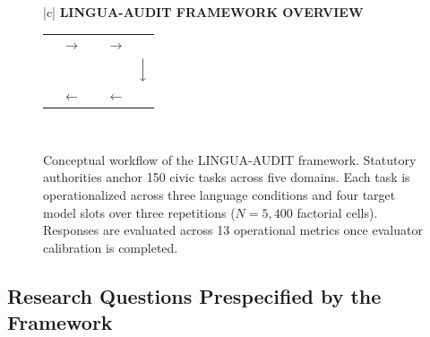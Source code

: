 \documentclass[11pt,a4paper]{article}
\begin{document}
\begin{figure}[htbp]
\centering
\small
\begin{tabular}{|c|}
\hline
\textbf{LINGUA-AUDIT FRAMEWORK OVERVIEW} \\[0.5em]
\begin{tabular}{ccccc}
\fbox{\parbox{3.5cm}{\centering \textbf{Statutory Authorities}\\ (Acts, Portals, Rules)}}
& $\longrightarrow$ &
\fbox{\parbox{3.5cm}{\centering \textbf{150 Benchmark Tasks}\\ (5 Civic Domains)}}
& $\longrightarrow$ &
\fbox{\parbox{3.5cm}{\centering \textbf{3 Language Prompts}\\ (EN, HI, Hinglish)}} \\
& & & & $\Big\downarrow$ \\
\fbox{\parbox{3.5cm}{\centering \textbf{13 Operational Metrics}\\ (Precision, Omission,\\ Safety, Consistency)}}
& $\longleftarrow$ &
\fbox{\parbox{3.7cm}{\centering \textbf{Automated Evaluator}\\ Protocol (Specified;\\ Validation PENDING)}}
& $\longleftarrow$ &
\fbox{\parbox{3.5cm}{\centering \textbf{4 Target LLM Slots}\\ (5,400 Factorial\\ Pipeline Matrix)}}
\end{tabular} \\[1em]
\hline
\end{tabular}
\caption{Conceptual workflow of the LINGUA-AUDIT framework. Statutory authorities anchor 150 civic tasks across five domains. Each task is operationalized across three language conditions and four target model slots over three repetitions ($N=5{,}400$ factorial cells). Responses are evaluated across 13 operational metrics once evaluator calibration is completed.}
\label{fig:framework_overview}
\end{figure}

\subsection{Research Questions Prespecified by the Framework}
\label{sec:rqs}
\end{document}
